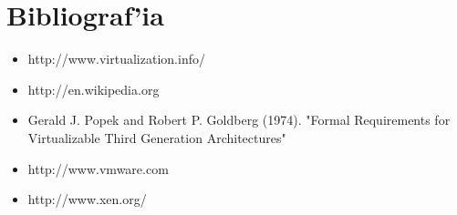 \section{Bibliograf'ia}

\begin{itemize}
	\item http://www.virtualization.info/
	\item http://en.wikipedia.org
	\item Gerald J. Popek and Robert P. Goldberg (1974). "Formal Requirements for Virtualizable Third Generation Architectures"
	\item http://www.vmware.com
	\item http://www.xen.org/
\end{itemize}
